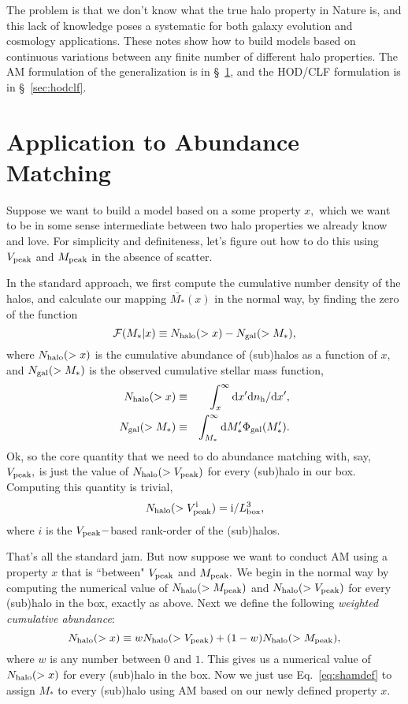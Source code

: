 \documentclass[usenatbib,usegraphicx,letterpaper]{mn2e}
\newcommand{\mpeak}{M_{\rm peak}}
\newcommand{\vpeak}{V_{\rm peak}}
\newcommand{\beq}{\begin{equation}}
\newcommand{\eeq}{\end{equation}}
\newcommand{\beqray}{\begin{eqnarray}}
\newcommand{\eeqray}{\end{eqnarray}}
\newcommand{\dd}{\mathrm{d}}
\newcommand{\Ngal}{N_{\rm gal}}
\newcommand{\Nhalo}{N_{\rm halo}}
\newcommand{\dnhalodx}[1]{{\rm d}n_{\rm h} / {\rm d}#1}
\newcommand{\mstar}{M_{\ast}}
\begin{document}
The problem is that we don't know what the true halo property in Nature is, and this lack of knowledge poses a systematic for both galaxy evolution and cosmology applications. These notes show how to build models based on continuous variations between any finite number of different halo properties. The AM formulation of the generalization is in \S~\ref{sec:sham}, and the HOD/CLF formulation is in  \S~\ref{sec:hodclf}. 


\section{Application to Abundance Matching}
\label{sec:sham}

Suppose we want to build a model based on a some property $x,$ which we want to be in some sense intermediate between two halo properties we already know and love. For simplicity and definiteness, let's figure out how to do this using $\vpeak$ and $\mpeak$ in the absence of scatter. 

In the standard approach, we first compute the cumulative number density of the halos, and calculate our mapping $\bar{\mstar}(x)$ in the normal way, by finding the zero of the function 
\beq
\label{eq:shamdef}
\mathcal{F}(\mstar | x) \equiv \Nhalo(> x) - \Ngal(>\mstar),
\eeq
where $\Nhalo(>x)$ is the cumulative abundance of (sub)halos as a function of $x,$ and $\Ngal(>\mstar)$ is the observed cumulative stellar mass function, 
\beqray
\Nhalo(>x) & \equiv & \int_{x}^{\infty}\dd{x'}\dnhalodx{x'}, \\
\Ngal(>\mstar) & \equiv & \int_{\mstar}^{\infty}\dd\mstar'\Phi_{\rm gal}(\mstar'). 
\eeqray
Ok, so the core quantity that we need to do abundance matching with, say, $\vpeak,$ is just the value of $\Nhalo(>\vpeak)$ for every (sub)halo in our box. Computing this quantity is trivial, $$\Nhalo(>\vpeak^{\rm i})={\rm i}/L^{3}_{\rm box},$$ where $i$ is the $\vpeak-$based rank-order of the (sub)halos. 

That's all the standard jam. But now suppose we want to conduct AM using a property $x$ that is ``between" $\vpeak$ and $\mpeak.$ We begin in the normal way by computing the numerical value of $\Nhalo(>\mpeak)$ and $\Nhalo(>\vpeak)$ for every (sub)halo in the box, exactly as above. Next we define the following {\em weighted cumulative abundance}:
\beq
\Nhalo(>x) \equiv w\Nhalo(>\vpeak) + (1-w)\Nhalo(>\mpeak), 
\eeq
where $w$ is any number between $0$ and $1.$ This gives us a numerical value of $\Nhalo(>x)$ for every (sub)halo in the box. 
Now we just use Eq.~\ref{eq:shamdef} to assign $\mstar$ to every (sub)halo using AM based on our newly defined property $x.$ 
\end{document}
